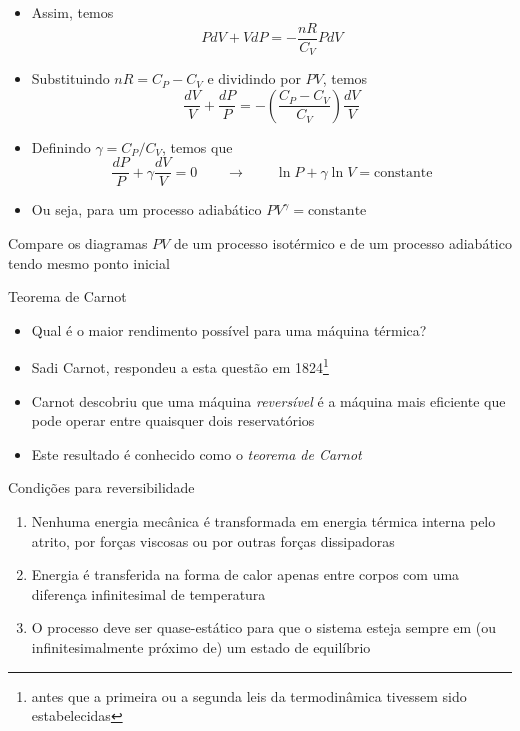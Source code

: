 \documentclass[t,%
brazilian,%
11pt,%
aspectratio=169,%
table%
]{beamer}
\begin{document}
\begin{frame}
    \begin{itemize}
        \item Assim, temos
            \[
                PdV + VdP = -\frac{nR}{C_V}PdV
            \]
        \item Substituindo $nR=C_P-C_V$ e dividindo por $PV$, temos
            \[
                \frac{dV}{V} + \frac{dP}{P} = - \left(\frac{C_P-C_V}{C_V}\right)\frac{dV}{V}
            \]
        \item Definindo $\gamma = C_P/C_V$, temos que
            \[
                \frac{dP}{P}+\gamma\frac{dV}{V}=0 \qquad\rightarrow\qquad
                \ln{P}+\gamma\ln{V}=\text{constante}
            \]

        \item Ou seja, para um processo adiabático $PV^\gamma = \text{constante}$
    \end{itemize}
    \pause
    \begin{block}{}
        Compare os diagramas $PV$ de um processo isotérmico e de um processo
        adiabático tendo mesmo ponto inicial
    \end{block}
\end{frame}

\begin{frame}{Teorema de Carnot}
    \begin{itemize}
        \item Qual é o maior rendimento possível para uma máquina térmica?
        \item Sadi Carnot, respondeu a esta questão em 1824\footnote{antes que a
                primeira ou a segunda leis da termodinâmica tivessem sido
                estabelecidas}
            \item Carnot descobriu que uma máquina \textit{reversível} é a
                máquina mais eficiente que pode operar entre quaisquer dois
                reservatórios
            \item Este resultado é conhecido como o \textit{teorema de Carnot}
    \end{itemize}

    \begin{block}{Condições para reversibilidade}
        \begin{enumerate}
            \item Nenhuma energia mecânica é transformada em energia térmica
                interna pelo atrito, por forças viscosas ou por outras forças
                dissipadoras
            \item Energia é transferida na forma de calor apenas entre corpos
                com uma diferença infinitesimal de temperatura
            \item O processo deve ser quase-estático para que o sistema esteja
                sempre em (ou infinitesimalmente próximo de) um estado de
                equilíbrio
        \end{enumerate}
    \end{block}
\end{frame}
\end{document}
